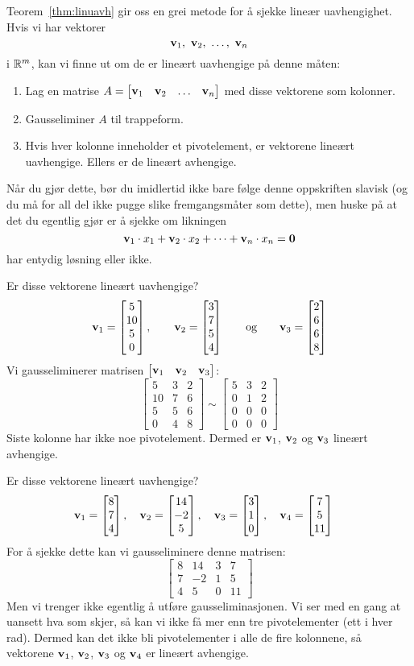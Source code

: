 Teorem~\ref{thm:linuavh} gir oss en grei metode for å sjekke lineær
uavhengighet.  Hvis vi har vektorer
\[
\mathbf{v}_1,\ \mathbf{v}_2,\ \ldots,\ \mathbf{v}_n
\]
i $\mathbb{R}^m$, kan vi finne ut om de er lineært uavhengige på denne måten:
\begin{enumerate}
\item Lag en matrise
$A = \begin{bmatrix} \mathbf{v}_1 & \mathbf{v}_2 & \ldots &
\mathbf{v}_n \end{bmatrix}$ med disse vektorene som kolonner.
\item Gausseliminer $A$ til trappeform.
\item Hvis hver kolonne inneholder et pivotelement, er vektorene lineært uavhengige.
Ellers er de lineært avhengige.
\end{enumerate}
Når du gjør dette, bør du imidlertid ikke bare følge denne oppskriften
slavisk (og du må for all del ikke pugge slike fremgangsmåter som
dette), men huske på at det du egentlig gjør er å sjekke om likningen
\[
\mathbf{v}_1 \cdot x_1 + \mathbf{v}_2 \cdot x_2 + \cdots + \mathbf{v}_n \cdot x_n = \mathbf{0}
\]
har entydig løsning eller ikke.


\begin{ex}
Er disse vektorene lineært uavhengige?
\[
\mathbf{v}_1 = \begin{bmatrix} 5 \\ 10 \\ 5 \\ 0 \end{bmatrix},\qquad
\mathbf{v}_2 = \begin{bmatrix} 3 \\ 7 \\ 5 \\ 4 \end{bmatrix}\qquad\text{og}\qquad
\mathbf{v}_3 = \begin{bmatrix} 2 \\ 6 \\ 6 \\ 8 \end{bmatrix}
\]
Vi gausseliminerer matrisen $\begin{bmatrix} \mathbf{v}_1 & \mathbf{v}_2 & \mathbf{v}_3 \end{bmatrix}$:
\[
\begin{bmatrix}
5 & 3 & 2 \\
10 & 7 & 6 \\
5 & 5 & 6 \\
0 & 4 & 8
\end{bmatrix}
\sim
\begin{bmatrix}
5 & 3 & 2 \\
0 & 1 & 2 \\
0 & 0 & 0 \\
0 & 0 & 0
\end{bmatrix}
\]
Siste kolonne har ikke noe pivotelement.  Dermed er $\mathbf{v}_1$,
$\mathbf{v}_2$ og $\mathbf{v}_3$ lineært avhengige.
\end{ex}


\begin{ex}
\label{ex:for-mange-vektorer}
Er disse vektorene lineært uavhengige?
\[
\mathbf{v}_1 = \begin{bmatrix} 8 \\ 7 \\ 4 \end{bmatrix},\quad
\mathbf{v}_2 = \begin{bmatrix} 14 \\ -2 \\ 5 \end{bmatrix},\quad
\mathbf{v}_3 = \begin{bmatrix} 3 \\ 1 \\ 0 \end{bmatrix},\quad
\mathbf{v}_4 = \begin{bmatrix} 7 \\ 5 \\ 11 \end{bmatrix}\quad
\]
For å sjekke dette kan vi gausseliminere denne matrisen:
\[
\begin{bmatrix}
8 & 14 & 3 & 7 \\
7 & -2 & 1 & 5 \\
4 & 5 & 0 & 11
\end{bmatrix}
\]
Men vi trenger ikke egentlig å utføre gausseliminasjonen.  Vi ser med
en gang at uansett hva som skjer, så kan vi ikke få mer enn tre
pivotelementer (ett i hver rad).  Dermed kan det ikke bli
pivotelementer i alle de fire kolonnene, så vektorene $\mathbf{v}_1$,
$\mathbf{v}_2$, $\mathbf{v}_3$ og $\mathbf{v}_4$ er lineært avhengige.
\end{ex}

